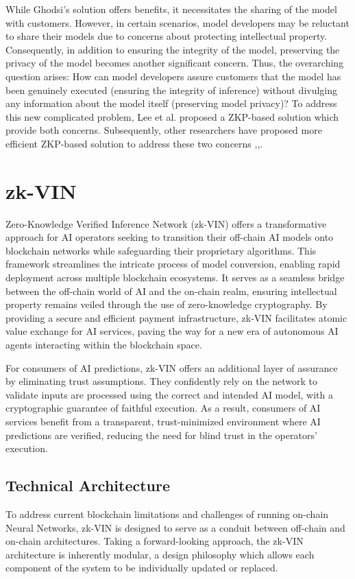 \documentclass[conference]{IEEEtran}
\begin{document}
While Ghodsi's solution offers benefits, it necessitates the sharing of the model with customers. However, in certain scenarios, model developers may be reluctant to share their models due to concerns about protecting intellectual property. Consequently, in addition to ensuring the integrity of the model, preserving the privacy of the model becomes another significant concern. Thus, the overarching question arises: How can model developers assure customers that the model has been genuinely executed (ensuring the integrity of inference) without divulging any information about the model itself (preserving model privacy)? To address this new complicated problem, Lee et al.\cite{Lee2020vCNNVC} proposed a ZKP-based solution which provide both concerns. Subsequently, other researchers have proposed more efficient ZKP-based solution to address these two concerns \cite{Liu2021zkCNNZK},\cite{Feng2021ZENAO},\cite{Ju2021EfficientSP}.




\section{zk-VIN}

Zero-Knowledge Verified Inference Network (zk-VIN) offers a transformative approach for AI operators seeking to transition their off-chain AI models onto blockchain networks while safeguarding their proprietary algorithms. This framework streamlines the intricate process of model conversion, enabling rapid deployment across multiple blockchain ecosystems. It serves as a seamless bridge between the off-chain world of AI and the on-chain realm, ensuring intellectual property remains veiled through the use of zero-knowledge cryptography. By providing a secure and efficient payment infrastructure, zk-VIN facilitates atomic value exchange for AI services, paving the way for a new era of autonomous AI agents interacting within the blockchain space.

For consumers of AI predictions, zk-VIN offers an additional layer of assurance by eliminating trust assumptions. They confidently rely on the network to validate inputs are processed using the correct and intended AI model, with a cryptographic guarantee of faithful execution.  As a result, consumers of AI services benefit from a transparent, trust-minimized environment where AI predictions are verified, reducing the need for blind trust in the operators' execution.
\subsection{Technical Architecture}
To address current blockchain limitations and challenges of running on-chain Neural Networks, zk-VIN is designed to serve as a conduit between off-chain and on-chain architectures. Taking a forward-looking approach, the zk-VIN architecture is inherently modular, a design philosophy which allows each component of the system to be individually updated or replaced.
\end{document}
